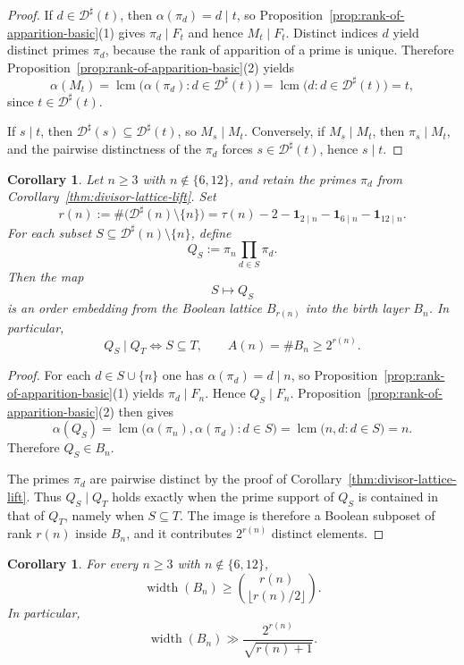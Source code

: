\documentclass[11pt,letterpaper]{article}
\numberwithin{equation}{section}
\theoremstyle{plain}
\newtheorem{corollary}[theorem]{Corollary}
\theoremstyle{definition}
\theoremstyle{remark}
\DeclareMathOperator{\lcmop}{lcm}
\DeclareMathOperator{\widthop}{width}
\begin{document}
\begin{proof}
If $d\in \mathcal D^\sharp(t)$, then $\alpha(\pi_d)=d\mid t$, so
Proposition~\ref{prop:rank-of-apparition-basic}(1) gives $\pi_d\mid F_t$ and
hence $M_t\mid F_t$. Distinct indices $d$ yield distinct primes $\pi_d$,
because the rank of apparition of a prime is unique. Therefore
Proposition~\ref{prop:rank-of-apparition-basic}(2) yields
\[
\alpha(M_t)
=
\lcmop\bigl(\alpha(\pi_d):d\in \mathcal D^\sharp(t)\bigr)
=
\lcmop\bigl(d:d\in \mathcal D^\sharp(t)\bigr)
=t,
\]
since $t\in \mathcal D^\sharp(t)$.

If $s\mid t$, then $\mathcal D^\sharp(s)\subseteq \mathcal D^\sharp(t)$, so
$M_s\mid M_t$. Conversely, if $M_s\mid M_t$, then $\pi_s\mid M_t$, and the
pairwise distinctness of the $\pi_d$ forces $s\in \mathcal D^\sharp(t)$, hence
$s\mid t$.
\end{proof}

\begin{corollary}
\label{thm:boolean-skeleton}
Let $n\ge 3$ with $n\notin\{6,12\}$, and retain the primes $\pi_d$ from
Corollary~\ref{thm:divisor-lattice-lift}. Set
\[
r(n):=\#\bigl(\mathcal D^\sharp(n)\setminus\{n\}\bigr)
=\tau(n)-2-\mathbf{1}_{2\mid n}-\mathbf{1}_{6\mid n}-\mathbf{1}_{12\mid n}.
\]
For each subset $S\subseteq \mathcal D^\sharp(n)\setminus\{n\}$, define
\[
Q_S:=\pi_n\prod_{d\in S}\pi_d.
\]
Then the map
\[
S\longmapsto Q_S
\]
is an order embedding from the Boolean lattice $B_{r(n)}$ into the birth layer
$B_n$. In particular,
\[
Q_S\mid Q_T \Longleftrightarrow S\subseteq T,
\qquad
A(n)=\#B_n\ge 2^{r(n)}.
\]
\end{corollary}

\begin{proof}
For each $d\in S\cup\{n\}$ one has $\alpha(\pi_d)=d\mid n$, so
Proposition~\ref{prop:rank-of-apparition-basic}(1) yields $\pi_d\mid F_n$.
Hence $Q_S\mid F_n$. Proposition~\ref{prop:rank-of-apparition-basic}(2) then
gives
\[
\alpha(Q_S)
=\lcmop\bigl(\alpha(\pi_n),\alpha(\pi_d):d\in S\bigr)
=\lcmop\bigl(n,d:d\in S\bigr)=n.
\]
Therefore $Q_S\in B_n$.

The primes $\pi_d$ are pairwise distinct by the proof of
Corollary~\ref{thm:divisor-lattice-lift}. Thus $Q_S\mid Q_T$ holds exactly when
the prime support of $Q_S$ is contained in that of $Q_T$, namely when
$S\subseteq T$. The image is therefore a Boolean subposet of rank $r(n)$
inside $B_n$, and it contributes $2^{r(n)}$ distinct elements.
\end{proof}

\begin{corollary}
\label{cor:birth-layer-width}
For every $n\ge 3$ with $n\notin\{6,12\}$,
\[
\widthop(B_n)\ge \binom{r(n)}{\lfloor r(n)/2\rfloor}.
\]
In particular,
\[
\widthop(B_n)\gg \frac{2^{r(n)}}{\sqrt{r(n)+1}}.
\]
\end{corollary}
\end{document}
